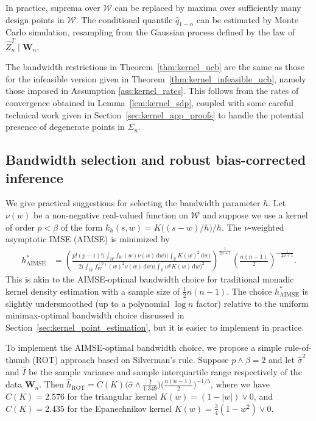 \documentclass[11pt,lof]{puthesis}
\newcommand{\R}{\ensuremath{\mathbb{R}}}
\newcommand{\bW}{\ensuremath{\mathbf{W}}}
\newcommand{\cW}{\ensuremath{\mathcal{W}}}
\DeclareMathOperator{\AIMSE}{AIMSE}
\DeclareMathOperator{\ROT}{ROT}
\newcommand{\diff}[1]{\,\mathrm{d}#1}
\theoremstyle{break}
\theoremstyle{proof}
\begin{document}
In practice, suprema over $\cW$ can be replaced by maxima over sufficiently
many design points in $\cW$. The conditional quantile $\hat q_{1-\alpha}$ can
be estimated by Monte Carlo simulation, resampling from the Gaussian process
defined by the law of $\hat Z_n^T \mid \bW_n$.

The bandwidth restrictions in Theorem~\ref{thm:kernel_ucb} are the same as
those for the infeasible version given in
Theorem~\ref{thm:kernel_infeasible_ucb},
namely those imposed in Assumption \ref{ass:kernel_rates}. This follows from
the rates
of convergence obtained in Lemma~\ref{lem:kernel_sdp}, coupled with some careful
technical work given in Section~\ref{sec:kernel_app_proofs} to handle the
potential
presence of degenerate points in $\Sigma_n$.

\subsection{Bandwidth selection and robust bias-corrected inference}
\label{sec:kernel_bandwidth_selection}

We give practical suggestions for selecting the bandwidth parameter $h$.
Let $\nu(w)$ be a non-negative real-valued function on $\cW$ and suppose we use
a kernel of order $p < \beta$ of the form $k_h(s,w) = K\big((s-w) / h\big)/h$.
The $\nu$-weighted asymptotic IMSE (AIMSE) is minimized by
%
\begin{align*}
h^*_{\AIMSE}
&=
\left(
\frac{p!(p-1)!
\Big(\int_\cW f_W(w) \nu(w) \diff{w}\Big)
\Big(\int_\R K(w)^2 \diff{w}\Big)}
{2 \Big(
\int_{\cW}
f_W^{(p)}(w)^2
\nu(w)
\diff{w}
\Big)
\Big(
\int_\R
w^p K(w)
\diff{w}
\Big)^2
}
\right)^{\frac{1}{2p+1}}
\left( \frac{n(n-1)}{2} \right)^{-\frac{1}{2p+1}}.
\end{align*}
%
This is akin to the AIMSE-optimal bandwidth choice for traditional monadic
kernel density estimation with a sample size of $\frac{1}{2}n(n-1)$. The choice
$h^*_{\AIMSE}$ is slightly undersmoothed (up to a polynomial $\log n$ factor)
relative to the uniform minimax-optimal bandwidth choice discussed in
Section~\ref{sec:kernel_point_estimation}, but it is easier to implement in
practice.

To implement the AIMSE-optimal bandwidth choice, we propose a simple
rule-of-thumb (ROT) approach based on Silverman's rule.
Suppose $p\wedge\beta=2$ and let $\hat\sigma^2$ and $\hat I$
be the sample variance and sample interquartile range respectively
of the data $\bW_n$. Then
$\hat{h}_{\ROT} = C(K) \big( \hat\sigma \wedge
\frac{\hat I}{1.349} \big) \big(\frac{n(n-1)}{2} \big)^{-1/5}$,
where we have $C(K)=2.576$ for the triangular kernel $K(w) = (1 - |w|) \vee 0$,
and $C(K)=2.435$ for the Epanechnikov kernel
$K(w) = \frac{3}{4}(1 - w^2) \vee 0$.
\end{document}
